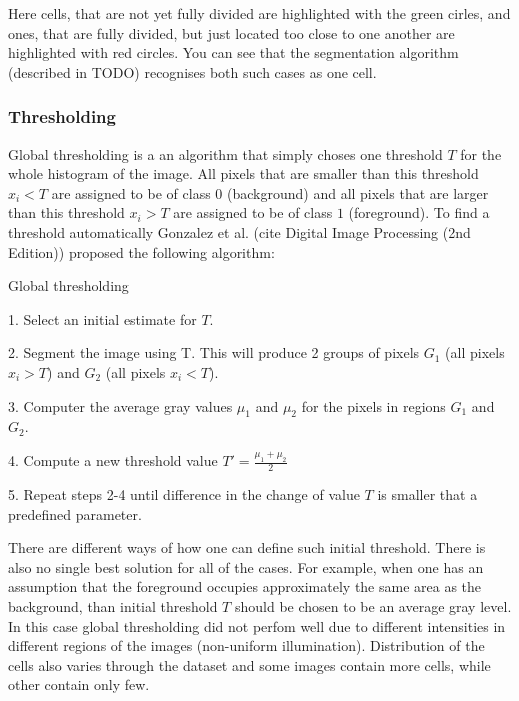 Here cells, that are not yet fully divided are highlighted with the green cirles, and ones, that are fully divided, but just located too close to one another are highlighted with red circles. You can see that the segmentation algorithm (described in TODO) recognises both such cases as one cell.

\subsubsection{Thresholding}

Global thresholding is a an algorithm that simply choses one threshold $T$ for the whole histogram of the image. All pixels that are smaller than this threshold $x_i < T$ are assigned to be of class $0$ (background) and all pixels that are larger than this threshold $x_i > T$ are assigned to be of class $1$ (foreground). To find a threshold automatically Gonzalez et al. (cite Digital Image Processing (2nd Edition)) proposed the following algorithm:

\begin{algorithm}
\caption{Global thresholding}\label{alg:global-thresholding}
\begin{algorithmic}
\item 1. Select an initial estimate for $T$.
\item 2. Segment the image using T. This will produce 2 groups of pixels $G_1$ (all pixels $x_i > T$) and $G_2$ (all pixels $x_i < T$).  
\item 3. Computer the average gray values $\mu_1$ and $\mu_2$ for the pixels in  regions $G_1$ and $G_2$.
\item 4. Compute a new threshold value 
    $T' = \frac{\mu_1 + \mu_2}{2}$
\item 5. Repeat steps 2-4 until difference in the change of value $T$ is smaller that a predefined parameter.
\end{algorithmic}
\end{algorithm}

There are different ways of how one can define such initial threshold. There is also no single best solution for all of the cases. For example, when one has an assumption that the foreground occupies approximately the same area as the background, than initial threshold $T$ should be chosen to be an average gray level. In this case global thresholding did not perfom well due to different intensities in different regions of the images (non-uniform illumination). Distribution of the cells also varies through the dataset and some images contain more cells, while other contain only few.

